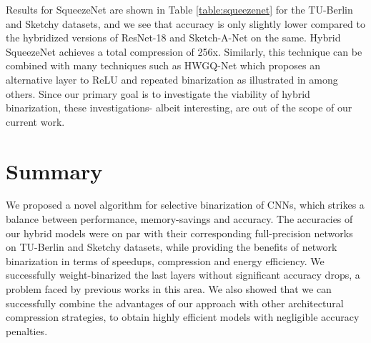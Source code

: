 \noindent Results for SqueezeNet are shown in Table \ref{table:squeezenet} for the TU-Berlin and Sketchy datasets, and we see that accuracy is only slightly lower compared to the hybridized versions of ResNet-18 and Sketch-A-Net on the same. Hybrid SqueezeNet achieves a total compression of 256x. Similarly, this technique can be combined with many techniques such as HWGQ-Net \cite{cai2017deep} which proposes an alternative layer to ReLU and repeated binarization as illustrated in \cite{tang2017train} among others. Since our primary goal is to investigate the viability of hybrid binarization, these investigations- albeit interesting, are out of the scope of our current work.

\section{Summary}
\noindent We proposed a novel algorithm for selective binarization of CNNs, which strikes a balance between performance, memory-savings and accuracy. The accuracies of our hybrid models were on par with their corresponding full-precision networks on TU-Berlin and Sketchy datasets, while providing the benefits of network binarization in terms of speedups, compression and energy efficiency. We successfully weight-binarized the last layers without significant accuracy drops, a problem faced by previous works in this area. We also showed that we can successfully combine the advantages of our approach with other architectural compression strategies, to obtain highly efficient models with negligible accuracy penalties. 